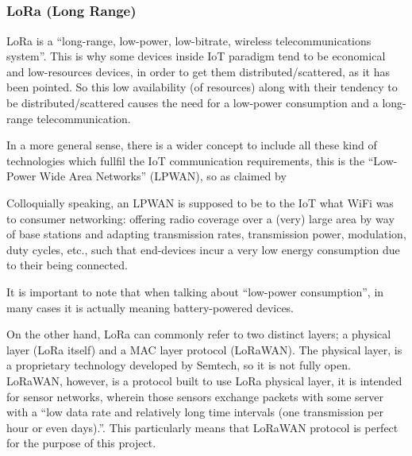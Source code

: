 \documentclass[11pt,a4paper,dvipsnames,twoside]{article}
\begin{document}
\subsubsection{\texorpdfstring{LoRa\textsuperscript{\textregistered} (Lo{\normalfont\sffamily ng} Ra{\normalfont\sffamily nge})}{LoRa (Long Range)}}
LoRa is a \enquote{long-range, low-power, low-bitrate, wireless telecommunications system}\cite[]{LoRaGeneral}. This is why some devices inside IoT paradigm tend to be economical and low-resources devices, in order to get them distributed/scattered, as it has been pointed. So this low availability (of resources) along with their tendency to be distributed/scattered causes the need for a low-power consumption and a long-range telecommunication.

In a more general sense, there is a wider concept to include all these kind of technologies which fullfil the IoT communication requirements, this is the \enquote{Low-Power Wide Area Networks} (LPWAN), so as claimed by \cite[]{LoRaGeneral}

\begin{quoting}
  Colloquially  speaking,  an LPWAN is supposed to be to the IoT what WiFi was to consumer networking: offering radio coverage over a (very) large area by way of base stations and adapting transmission rates, transmission power, modulation, duty cycles, etc., such that end-devices incur a very low energy consumption due to their being connected.
\end{quoting}

It is important to note that when talking about \enquote{low-power consumption}, in many cases it is actually meaning battery-powered devices.

On the other hand, LoRa can commonly refer to two distinct layers; a physical layer (LoRa itself) and a MAC layer protocol (LoRaWAN). The physical layer, is a proprietary technology developed by Semtech, so it is not fully open. LoRaWAN, however, is a protocol built to use LoRa physical layer, it is intended for sensor networks, wherein those sensors exchange packets with some server with a \enquote{low data rate and relatively long time intervals (one transmission per hour or even days).}\cite[p.~9]{LoRaGeneral}. This particularly means that LoRaWAN protocol is perfect for the purpose of this project.  
\end{document}
